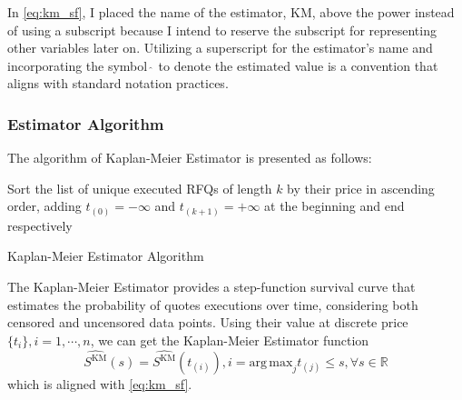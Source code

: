 In \eqref{eq:km_sf}, I placed the name of the estimator, KM, above the power instead of using a subscript because I intend to reserve the subscript for representing other variables later on. Utilizing a superscript for the estimator's name and incorporating the symbol $\hat ~$ to denote the estimated value is a convention that aligns with standard notation practices.

\subsubsection{Estimator Algorithm}
The algorithm of Kaplan-Meier Estimator is presented as follows:

\begin{algorithm}[H]
    Sort the list of unique executed RFQs of length $k$ by their price in ascending order, adding $t_{(0)} = -\infty$ and $t_{(k+1)} = +\infty$ at the beginning and end respectively\;
\caption{Kaplan-Meier Estimator Algorithm}
\end{algorithm}

The Kaplan-Meier Estimator provides a step-function survival curve that estimates the probability of quotes executions over time, considering both censored and uncensored data points. Using their value at discrete price $\{t_i\}, i = 1, \cdots, n$, we can get the Kaplan-Meier Estimator function
\[
    \widehat {S^{\text{KM}}}(s) = \widehat {S^{\text{KM}}}(t_{(i)}), i = \mathrm{arg\,max}_j t_{(j)}\leqslant s, \forall s \in \mathbb{R}
\]
which is aligned with \eqref{eq:km_sf}.

